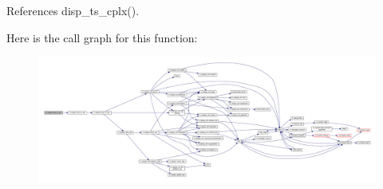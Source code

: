 References disp\+\_\+ts\+\_\+cplx().

Here is the call graph for this function\+:
\nopagebreak
\begin{figure}[H]
\begin{center}
\leavevmode
\includegraphics[width=350pt]{namespacem__display_a2d8cd9c698ef035111fdc53524abe523_cgraph}
\end{center}
\end{figure}
\mbox{\label{namespacem__display_a8462e9d78a29a0658777c7af9eabd28c}} 
